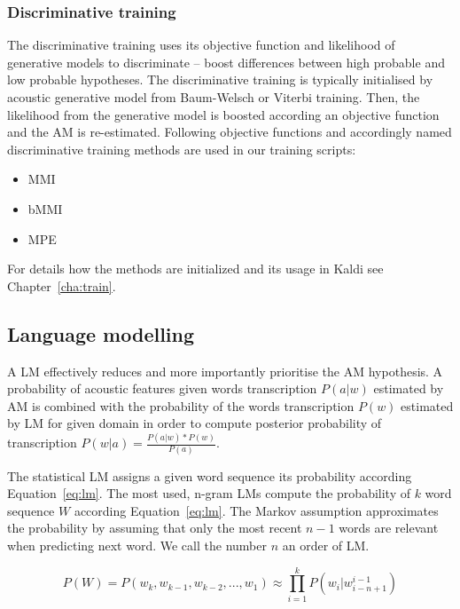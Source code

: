 \subsubsection*{Discriminative training}
\label{sub:subsection_name}
The discriminative training uses its objective function and likelihood of generative models to discriminate -- boost differences between high probable and low probable hypotheses.
The discriminative training is typically initialised by acoustic generative model from Baum-Welsch or Viterbi training.
Then, the likelihood from the generative model is boosted according an objective function and the \ac{AM} is re-estimated.
Following objective functions and accordingly named discriminative training methods are used in our training scripts:
\begin{itemize}
    \item \acl{MMI}\cite{chow1990maximum} 
    \item \acl{bMMI}\cite{povey2008boosted}
    \item \acl{MPE}\cite{povey2003mmi}
\end{itemize}
For details how the methods are initialized and its usage in Kaldi see Chapter~\ref{cha:train}.

\subsection{Language modelling}
\label{sub:lm}

A \acl{LM} effectively reduces and more importantly prioritise the \ac{AM} hypothesis.
A probability of acoustic features given words transcription $P(a|w)$ estimated by \ac{AM} is combined with the probability of the words transcription $P(w)$ estimated by \ac{LM} for given domain in order to compute posterior probability of transcription $P(w|a) = \frac{P(a|w)*P(w)}{P(a)}$.

The statistical \ac{LM} assigns a given word sequence its probability according Equation~\ref{eq:lm}.
The most used, n-gram \acp{LM} compute the probability of $k$ word sequence $W$ according Equation~\ref{eq:lm}.\cite{brants2007large}
The Markov assumption approximates the probability by assuming that only the most recent $n-1$ words are relevant when predicting next word.
We call the number $n$ an order of \ac{LM}.

\begin{equation} \label{eq:lm}
    P(W)=P(w_k,  w_{k-1}, w_{k-2}, ..., w_1) \approx \prod_{i=1}^{k}{P(w_i|w^{i-1}_{i-n+1})}
\end{equation}


